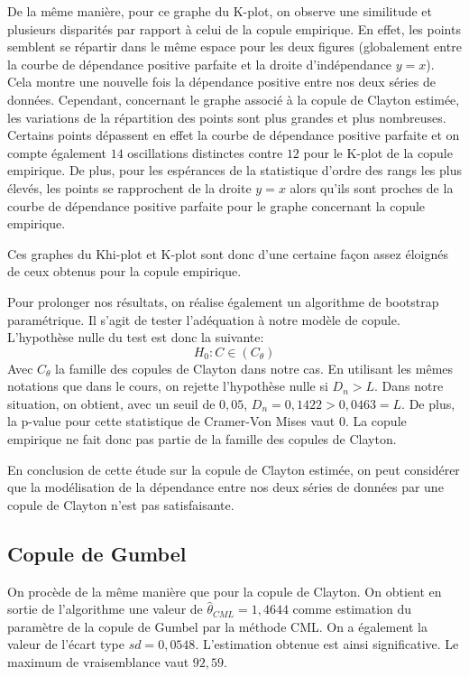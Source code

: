 De la même manière, pour ce graphe du K-plot, on observe une similitude et plusieurs disparités par rapport à celui de la copule empirique. En effet, les points semblent se répartir dans le même espace pour les deux figures (globalement entre la courbe de dépendance positive parfaite et la droite d'indépendance $y=x$). Cela montre une nouvelle fois la dépendance positive entre nos deux séries de données. Cependant, concernant le graphe associé à la copule de Clayton estimée, les variations de la répartition des points sont plus grandes et plus nombreuses. Certains points dépassent en effet la courbe de dépendance positive parfaite et on compte également $14$ oscillations distinctes contre $12$ pour le K-plot de la copule empirique. De plus, pour les espérances de la statistique d'ordre des rangs les plus élevés, les points se rapprochent de la droite $y=x$ alors qu'ils sont proches de la courbe de dépendance positive parfaite pour le graphe concernant la copule empirique.

Ces graphes du Khi-plot et K-plot sont donc d'une certaine façon assez éloignés de ceux obtenus pour la copule empirique.

Pour prolonger nos résultats, on réalise également un algorithme de bootstrap paramétrique. Il s'agit de tester l'adéquation à notre modèle de copule. L'hypothèse nulle du test est donc la suivante:
$$
H_0 : C \in (C_{\theta})
$$
Avec $C_{\theta}$ la famille des copules de Clayton dans notre cas. 
En utilisant les mêmes notations que dans le cours, on rejette l'hypothèse nulle si $D_n > L$. 
Dans notre situation, on obtient, avec un seuil de $0,05$, $D_n = 0,1422 > 0,0463 = L$. De plus, la p-value pour cette statistique de Cramer-Von Mises vaut $0$. La copule empirique ne fait donc pas partie de la famille des copules de Clayton.

En conclusion de cette étude sur la copule de Clayton estimée, on peut considérer que la modélisation de la dépendance entre nos deux séries de données par une copule de Clayton n'est pas satisfaisante.

\subsection{Copule de Gumbel}

On procède de la même manière que pour la copule de Clayton. On obtient en sortie de l'algorithme une valeur de $\widehat{\theta}_{CML}=1,4644$ comme estimation du paramètre de la copule de Gumbel par la méthode CML. On a également la valeur de l'écart type $sd = 0,0548$. L'estimation obtenue est ainsi significative. Le maximum de vraisemblance vaut $92,59$.

